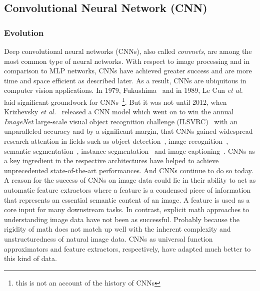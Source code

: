 \documentclass[12pt,a4paper]{article}
\begin{document}
\subsection{Convolutional Neural Network (CNN)}
\subsubsection{Evolution}
Deep convolutional neural networks (CNNs), also called \textit{convnets}, are among the most common type of neural networks. With respect to image processing and in comparison to MLP networks, CNNs have achieved greater success and are more time and space efficient as described later. As a result, CNNs are ubiquitous in computer vision applications. In 1979, Fukushima~\cite{FukushimaCnn79} and in 1989, Le Cun \textit{et al.}~\cite{CunGrounworkCNNs} laid significant groundwork for CNNs~\footnote{this is not an account of the history of CNNs}. But it was not until 2012, when Krizhevsky \textit{et al.}~\cite{AlexNet} released a CNN model which went on to win the annual \textit{ImageNet} large-scale visual object recognition challenge (ILSVRC)~\cite{Imagenet} with an unparalleled accuracy and by a significant margin, that CNNs gained widespread research attention in fields such as object detection~\cite{FasterRCNN}, image recognition~\cite{AlexNet,DenseNet}, semantic segmentation~\cite{DeepLabv3+}, instance segmentation~\cite{MaskScoringRCNN} and image captioning~\cite{ImageCaptioningSOTA}. CNNs as a key ingredient in the respective architectures have helped to achieve unprecedented state-of-the-art performances. And CNNs continue to do so today. A reason for the success of CNNs on image data could lie in their ability to act as automatic feature extractors where a feature is a condensed piece of information that represents an essential semantic content of an image. A feature is used as a core input for many downstream tasks. In contrast, explicit math approaches to understanding image data have not been as successful. Probably because the rigidity of math does not match up well with the inherent complexity and unstructuredness of natural image data. CNNs as universal function approximators and feature extractors, respectively, have adapted much better to this kind of data.
\end{document}
